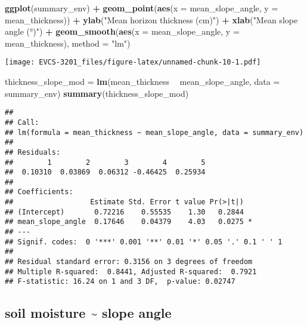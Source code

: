\documentclass[]{book}
\newenvironment{Shaded}{\begin{snugshade}}{\end{snugshade}}
\newcommand{\KeywordTok}[1]{\textcolor[rgb]{0.13,0.29,0.53}{\textbf{#1}}}
\newcommand{\DataTypeTok}[1]{\textcolor[rgb]{0.13,0.29,0.53}{#1}}
\newcommand{\StringTok}[1]{\textcolor[rgb]{0.31,0.60,0.02}{#1}}
\newcommand{\OperatorTok}[1]{\textcolor[rgb]{0.81,0.36,0.00}{\textbf{#1}}}
\newcommand{\NormalTok}[1]{#1}
\begin{document}
\begin{Shaded}
\begin{Highlighting}[]
\KeywordTok{ggplot}\NormalTok{(summary_env) }\OperatorTok{+}
\StringTok{  }\KeywordTok{geom_point}\NormalTok{(}\KeywordTok{aes}\NormalTok{(}\DataTypeTok{x =}\NormalTok{ mean_slope_angle, }\DataTypeTok{y =}\NormalTok{ mean_thickness)) }\OperatorTok{+}
\StringTok{  }\KeywordTok{ylab}\NormalTok{(}\StringTok{"Mean horizon thickness (cm)"}\NormalTok{) }\OperatorTok{+}
\StringTok{  }\KeywordTok{xlab}\NormalTok{(}\StringTok{"Mean slope angle (°)"}\NormalTok{) }\OperatorTok{+}
\StringTok{  }\KeywordTok{geom_smooth}\NormalTok{(}\KeywordTok{aes}\NormalTok{(}\DataTypeTok{x =}\NormalTok{ mean_slope_angle, }\DataTypeTok{y =}\NormalTok{ mean_thickness), }\DataTypeTok{method =} \StringTok{"lm"}\NormalTok{)}
\end{Highlighting}
\end{Shaded}

\texttt{[image: EVCS-3201\_files/figure-latex/unnamed-chunk-10-1.pdf]}

\begin{Shaded}
\begin{Highlighting}[]
\NormalTok{thickness_slope_mod =}\StringTok{ }\KeywordTok{lm}\NormalTok{(mean_thickness }\OperatorTok{~}\StringTok{ }\NormalTok{mean_slope_angle, }\DataTypeTok{data =}\NormalTok{ summary_env)}
\KeywordTok{summary}\NormalTok{(thickness_slope_mod)}
\end{Highlighting}
\end{Shaded}

\begin{verbatim}
## 
## Call:
## lm(formula = mean_thickness ~ mean_slope_angle, data = summary_env)
## 
## Residuals:
##        1        2        3        4        5 
##  0.10310  0.03869  0.06312 -0.46425  0.25934 
## 
## Coefficients:
##                  Estimate Std. Error t value Pr(>|t|)  
## (Intercept)       0.72216    0.55535    1.30   0.2844  
## mean_slope_angle  0.17646    0.04379    4.03   0.0275 *
## ---
## Signif. codes:  0 '***' 0.001 '**' 0.01 '*' 0.05 '.' 0.1 ' ' 1
## 
## Residual standard error: 0.3156 on 3 degrees of freedom
## Multiple R-squared:  0.8441, Adjusted R-squared:  0.7921 
## F-statistic: 16.24 on 1 and 3 DF,  p-value: 0.02747
\end{verbatim}

\subsection*{soil moisture \textasciitilde{} slope
angle}\label{soil-moisture-slope-angle}
\end{document}
